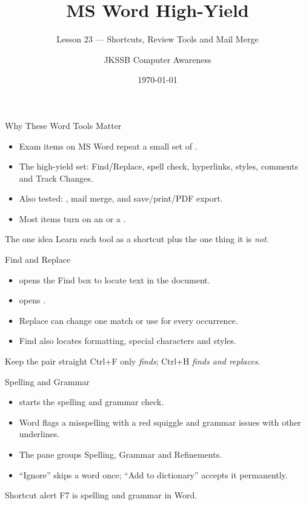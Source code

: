 \documentclass[aspectratio=169]{beamer}
\title{MS Word High-Yield}
\subtitle{Lesson 23 --- Shortcuts, Review Tools and Mail Merge}
\author{JKSSB Computer Awareness}
\date{\today}
\begin{document}
\frame{\titlepage}

\begin{frame}{Why These Word Tools Matter}
  \begin{itemize}
    \item Exam items on MS Word repeat a small set of .
    \item The high-yield set: Find/Replace, spell check, hyperlinks, styles,
      comments and Track Changes.
    \item Also tested: , mail merge, and
      save/print/PDF export.
    \item Most items turn on an  or a
      .
  \end{itemize}
  \begin{block}{The one idea}
    Learn each tool as a shortcut plus the one thing it is \emph{not}.
  \end{block}
\end{frame}

\begin{frame}{Find and Replace}
  \begin{itemize}
    \item {} opens the Find box to locate text in the document.
    \item {} opens .
    \item Replace can change one match or use  for every
      occurrence.
    \item Find also locates formatting, special characters and styles.
  \end{itemize}
  \begin{block}{Keep the pair straight}
    Ctrl+F only \emph{finds}; Ctrl+H \emph{finds and replaces}.
  \end{block}
\end{frame}

\begin{frame}{Spelling and Grammar}
  \begin{itemize}
    \item {} starts the spelling and grammar check.
    \item Word flags a misspelling with a red squiggle and grammar issues with
      other underlines.
    \item The  pane groups Spelling, Grammar and Refinements.
    \item ``Ignore'' skips a word once; ``Add to dictionary'' accepts it
      permanently.
  \end{itemize}
  \begin{alertblock}{Shortcut alert}
    F7 is spelling and grammar in Word. 
  \end{alertblock}
\end{frame}
\end{document}
